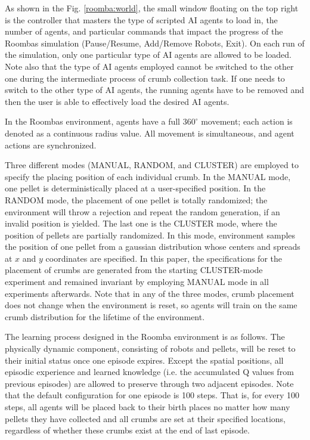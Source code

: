 \documentclass[conference]{IEEEtran}
\begin{document}
As shown in the Fig. \ref{roomba:world}, the small window floating on the top right
is the controller that masters the type of scripted AI agents to load in, the
number of agents, and particular commands that impact the progress of the
Roombas simulation (Pause/Resume, Add/Remove Robots, Exit). On each run of the
simulation, only one particular type of AI agents are allowed to be loaded.
Note also that the type of AI agents employed cannot be switched to the other
one during the intermediate process of crumb collection task. 
If one needs to switch to the other type of AI agents, the running agents have
to be removed and then the user is able to effectively load the desired AI agents.


In the Roombas environment, agents have a full $360^\circ$ movement; each action is
denoted as a continuous radius value. All movement is simultaneous, and agent actions are synchronized. 


Three different modes (MANUAL, RANDOM, and CLUSTER) are employed to specify
the placing position of each individual crumb.
In the MANUAL mode, one pellet is deterministically placed at a user-specified
position. 
In the RANDOM mode, the placement of one pellet is totally randomized; the
environment will throw a rejection and repeat the random generation, if an
invalid position is yielded. The last one is the CLUSTER mode, where the
position of pellets are partially randomized. In this mode,
environment samples the position of one pellet from a gaussian distribution
whose centers and spreads at $x$ and $y$ coordinates are specified. 
In this paper, the specifications for the placement of crumbs are generated
from the starting CLUSTER-mode experiment and remained invariant by
employing MANUAL mode in all experiments afterwards.
Note that in any of the three modes, crumb placement does not change when the environment is reset, so agents will train on the same crumb distribution for the lifetime of the environment.

The learning process designed in the Roomba environment is as follows. 
The physically dynamic component, consisting of robots and pellets, will be
reset to their initial status once one episode expires. 
Except the spatial positions, all episodic experience and learned knowledge
(i.e. the accumulated Q values from previous episodes) are allowed to preserve
through two adjacent episodes.  
Note that the default configuration for one episode is 100 steps. That is,
for every 100 steps, all agents will be placed back to their birth places no
matter how many pellets they have collected and all crumbs are set at
their specified locations, regardless of whether these crumbs exist at the end
of last episode. 
\end{document}
